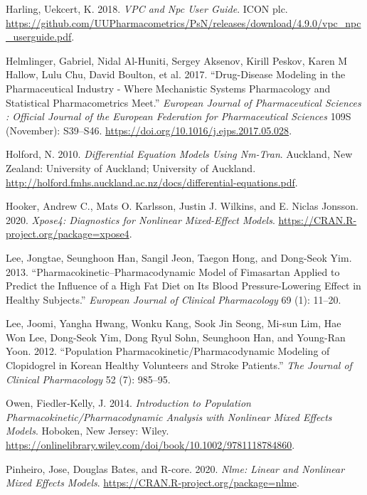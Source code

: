 \documentclass[
  10pt,
  krantz2,
  a4paper]{krantz}
\newlength{\cslhangindent}
\newenvironment{cslreferences}%
  {\setlength{\parindent}{0pt}%
  \everypar{\setlength{\hangindent}{\cslhangindent}}\ignorespaces}%
  {\par}
\theoremstyle{definition}
\theoremstyle{definition}
\theoremstyle{definition}
\theoremstyle{remark}
\begin{document}
\begin{cslreferences}
\leavevmode\hypertarget{ref-vpcnpc}{}%
Harling, Uekcert, K. 2018. \emph{VPC and Npc User Guide}. ICON plc. \url{https://github.com/UUPharmacometrics/PsN/releases/download/4.9.0/vpc_npc_userguide.pdf}.

\leavevmode\hypertarget{ref-helmlinger2017drug}{}%
Helmlinger, Gabriel, Nidal Al-Huniti, Sergey Aksenov, Kirill Peskov, Karen M Hallow, Lulu Chu, David Boulton, et al. 2017. ``Drug-Disease Modeling in the Pharmaceutical Industry - Where Mechanistic Systems Pharmacology and Statistical Pharmacometrics Meet.'' \emph{European Journal of Pharmaceutical Sciences : Official Journal of the European Federation for Pharmaceutical Sciences} 109S (November): S39--S46. \url{https://doi.org/10.1016/j.ejps.2017.05.028}.

\leavevmode\hypertarget{ref-nickholford}{}%
Holford, N. 2010. \emph{Differential Equation Models Using Nm-Tran}. Auckland, New Zealand: University of Auckland; University of Auckland. \url{http://holford.fmhs.auckland.ac.nz/docs/differential-equations.pdf}.

\leavevmode\hypertarget{ref-R-xpose4}{}%
Hooker, Andrew C., Mats O. Karlsson, Justin J. Wilkins, and E. Niclas Jonsson. 2020. \emph{Xpose4: Diagnostics for Nonlinear Mixed-Effect Models}. \url{https://CRAN.R-project.org/package=xpose4}.

\leavevmode\hypertarget{ref-lee2013pharmacokinetic}{}%
Lee, Jongtae, Seunghoon Han, Sangil Jeon, Taegon Hong, and Dong-Seok Yim. 2013. ``Pharmacokinetic--Pharmacodynamic Model of Fimasartan Applied to Predict the Influence of a High Fat Diet on Its Blood Pressure-Lowering Effect in Healthy Subjects.'' \emph{European Journal of Clinical Pharmacology} 69 (1): 11--20.

\leavevmode\hypertarget{ref-lee2012population}{}%
Lee, Joomi, Yangha Hwang, Wonku Kang, Sook Jin Seong, Mi-sun Lim, Hae Won Lee, Dong-Seok Yim, Dong Ryul Sohn, Seunghoon Han, and Young-Ran Yoon. 2012. ``Population Pharmacokinetic/Pharmacodynamic Modeling of Clopidogrel in Korean Healthy Volunteers and Stroke Patients.'' \emph{The Journal of Clinical Pharmacology} 52 (7): 985--95.

\leavevmode\hypertarget{ref-kelly}{}%
Owen, Fiedler‐Kelly, J. 2014. \emph{Introduction to Population Pharmacokinetic/Pharmacodynamic Analysis with Nonlinear Mixed Effects Models}. Hoboken, New Jersey: Wiley. \url{https://onlinelibrary.wiley.com/doi/book/10.1002/9781118784860}.

\leavevmode\hypertarget{ref-R-nlme}{}%
Pinheiro, Jose, Douglas Bates, and R-core. 2020. \emph{Nlme: Linear and Nonlinear Mixed Effects Models}. \url{https://CRAN.R-project.org/package=nlme}.


\end{cslreferences}
\end{document}
